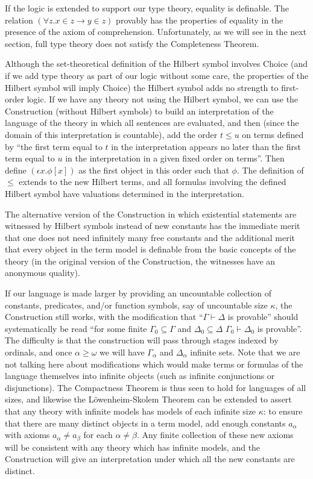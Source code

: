 \documentclass[12pt]{book}
\begin{document}
If the logic is extended to support our type theory, equality is
definable.  The relation $(\forall z.x\in z \rightarrow y \in z)$
provably has the properties of equality in the presence of the axiom
of comprehension.  Unfortunately, as we will see in the next section,
full type theory does not satisfy the Completeness Theorem.

Although the set-theoretical definition of the Hilbert symbol involves
Choice (and if we add type theory as part of our logic without some
care, the properties of the Hilbert symbol will imply Choice) the
Hilbert symbol adds no strength to first-order logic.  If we have any
theory not using the Hilbert symbol, we can use the Construction
(without Hilbert symbols) to build an interpretation of the language
of the theory in which all sentences are evaluated, and then (since
the domain of this interpretation is countable), add the order $t \leq
u$ on terms defined by ``the first term equal to $t$ in the
interpretation appears no later than the first term equal to $u$ in the
interpretation in a given fixed order on terms''.  Then define
$(\epsilon x.\phi[x])$ as the first object in this order such that
$\phi$.  The definition of $\leq$ extends to the new Hilbert terms,
and all formulas involving the defined Hilbert symbol have valuations
determined in the interpretation.

The alternative version of the Construction in which existential
statements are witnessed by Hilbert symbols instead of new constants
has the immediate merit that one does not need infinitely many free
constants and the additional merit that every object in the term model
is definable from the basic concepts of the theory (in the original
version of the Construction, the witnesses have an anonymous quality).

If our language is made larger by providing an uncountable collection
of constants, predicates, and/or function symbols, say of uncountable
size $\kappa$, the Construction still works, with the modification
that ``$\Gamma \vdash \Delta$ is provable'' should systematically be
read ``for some finite $\Gamma_0 \subseteq \Gamma$ and $\Delta_0
\subseteq \Delta$ $\Gamma_0 \vdash \Delta_0$ is provable''.  The
difficulty is that the construction will pass through stages indexed
by ordinals, and once $\alpha \geq \omega$ we will have
$\Gamma_{\alpha}$ and $\Delta_{\alpha}$ infinite sets.  Note that we
are not talking here about modifications which would make terms or
formulas of the language themselves into infinite objects (such as
infinite conjunctions or disjunctions).  The Compactness Theorem is
thus seen to hold for languages of all sizes, and likewise the
L\"owenheim-Skolem Theorem can be extended to assert that any theory
with infinite models has models of each infinite size $\kappa$: to
ensure that there are many distinct objects in a term model, add
enough constants $a_{\alpha}$ with axioms $a_{\alpha} \neq a_{\beta}$
for each $\alpha \neq \beta$.  Any finite collection of these new
axioms will be consistent with any theory which has infinite models,
and the Construction will give an interpretation under which all the
new constants are distinct.
\end{document}
